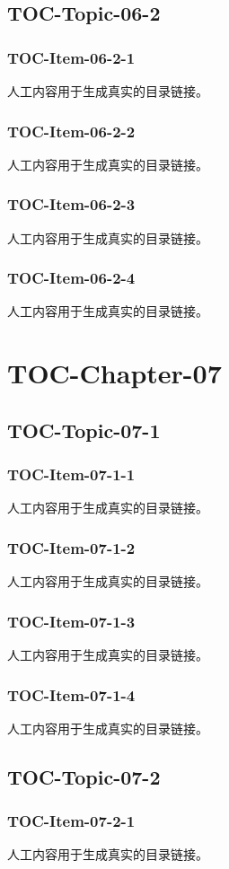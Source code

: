 \subsection{TOC-Topic-06-2}
\subsubsection{TOC-Item-06-2-1}
人工内容用于生成真实的目录链接。
\subsubsection{TOC-Item-06-2-2}
人工内容用于生成真实的目录链接。
\subsubsection{TOC-Item-06-2-3}
人工内容用于生成真实的目录链接。
\subsubsection{TOC-Item-06-2-4}
人工内容用于生成真实的目录链接。
\section{TOC-Chapter-07}
\subsection{TOC-Topic-07-1}
\subsubsection{TOC-Item-07-1-1}
人工内容用于生成真实的目录链接。
\subsubsection{TOC-Item-07-1-2}
人工内容用于生成真实的目录链接。
\subsubsection{TOC-Item-07-1-3}
人工内容用于生成真实的目录链接。
\subsubsection{TOC-Item-07-1-4}
人工内容用于生成真实的目录链接。
\subsection{TOC-Topic-07-2}
\subsubsection{TOC-Item-07-2-1}
人工内容用于生成真实的目录链接。
